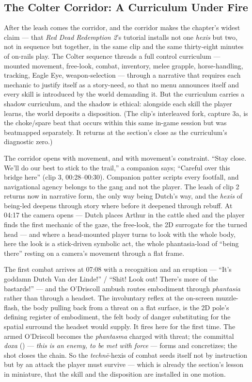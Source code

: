\bigskip

\subsection*{The Colter Corridor: A Curriculum Under Fire}

After the leash comes the corridor, and the corridor makes the chapter's widest claim — that \textit{Red Dead Redemption 2}'s tutorial installs not one \textit{hexis} but two, not in sequence but together, in the same clip and the same thirty-eight minutes of on-rails play. The Colter sequence threads a full control curriculum — mounted movement, free-look, combat, inventory, melee grapple, horse-handling, tracking, Eagle Eye, weapon-selection — through a narrative that requires each mechanic to justify itself as a story-need, so that no menu announces itself and every skill is introduced by the world demanding it. But the curriculum carries a shadow curriculum, and the shadow is ethical: alongside each skill the player learns, the world deposits a disposition. (The clip's interleaved fork, capture 3a, is the choke/spare beat that occurs within this same in-game session but was beatmapped separately. It returns at the section's close as the curriculum's diagnostic zero.)

The corridor opens with movement, and with movement's constraint. ``Stay close. We'll do our best to stick to the trail,'' a companion says; ``Careful over this bridge here'' (clip 3, 00:28–00:30). Companion patter scripts every footfall, and navigational agency belongs to the gang and not the player. The leash of clip 2 returns now in narrative form, the only way being Dutch's way, and the \textit{hexis} of being-led deepens through story where before it deepened through rebuff. At 04:17 the camera opens — Dutch places Arthur in the cattle shed and the player finds the first mechanic of the gaze, the free-look, the 2D surrogate for the turned head — and where a head-mounted player turns to look with the whole body, here the look is a stick-driven symbolic act, the whole phantasia-load of ``being there'' resting on a camera's movement through a flat frame.

The first combat arrives at 07:08 with a recognition and an eruption — ``It's goddamn Dutch Van der Linde!'' / ``Shit! Look out! There's more of the bastards!'' — and the O'Driscoll ambush routes embodiment through \textit{phantasia} rather than through a headset. The involuntary reflex at the on-screen muzzle-flash, the body pulling back from a threat on a flat surface, is the 2D pole's defining register of embodiment, the felt body of danger substituting for the spatial surround the headset would supply. It fires here for the first time. The armed O'Driscoll becomes the \textit{phantasma} charged with threat; the committal \textit{doxa} () — \textit{this is an enemy, to be met with force} — forms and concretizes; the shot closes the chain. So the \textit{technē}-hexis of combat seeds itself not by instruction but by an attack the player must survive — which is already the section's lesson in miniature, that the skill and the disposition are installed in one motion.

